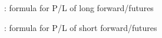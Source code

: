\subsection*{}
\item {}: formula for P/L of long forward/futures
\item {}: formula for P/L of short forward/futures
